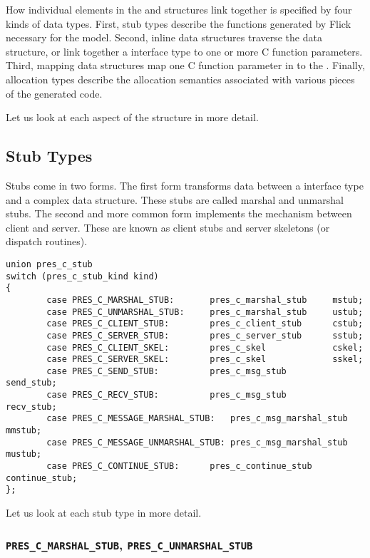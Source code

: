 How individual elements in the \MINT{} and \CAST{} structures link together is
specified by four kinds of data types.  First, stub types describe the
functions generated by Flick necessary for the \IPC{} model.  Second, inline
data structures traverse the \MINT{} data structure, or link together a \MINT{}
interface type to one or more C function parameters.  Third, mapping data
structures map one C function parameter in to the \MINT{}\@.  Finally,
allocation types describe the allocation semantics associated with various
pieces of the generated code.

Let us look at each aspect of the \PRESC{} structure in more detail.



\subsection{Stub Types}
\label{subsec:PRESC:Stub Types}

Stubs come in two forms.  The first form transforms data between a \MINT{}
interface type and a complex data structure.  These stubs are called marshal
and unmarshal stubs.  The second and more common form implements the \IPC{}
mechanism between client and server.  These are known as client stubs and
server skeletons (or dispatch routines).

\begin{verbatim}
union pres_c_stub
switch (pres_c_stub_kind kind)
{
        case PRES_C_MARSHAL_STUB:       pres_c_marshal_stub     mstub;
        case PRES_C_UNMARSHAL_STUB:     pres_c_marshal_stub     ustub;
        case PRES_C_CLIENT_STUB:        pres_c_client_stub      cstub;
        case PRES_C_SERVER_STUB:        pres_c_server_stub      sstub;
        case PRES_C_CLIENT_SKEL:        pres_c_skel             cskel;
        case PRES_C_SERVER_SKEL:        pres_c_skel             sskel;
        case PRES_C_SEND_STUB:          pres_c_msg_stub         send_stub;
        case PRES_C_RECV_STUB:          pres_c_msg_stub         recv_stub;
        case PRES_C_MESSAGE_MARSHAL_STUB:   pres_c_msg_marshal_stub     mmstub;
        case PRES_C_MESSAGE_UNMARSHAL_STUB: pres_c_msg_marshal_stub     mustub;
        case PRES_C_CONTINUE_STUB:      pres_c_continue_stub    continue_stub;
};
\end{verbatim}

Let us look at each \PRESC{} stub type in more detail.

\subsubsection{\texttt{PRES\_C\_MARSHAL\_STUB},
               \texttt{PRES\_C\_UNMARSHAL\_STUB}}

